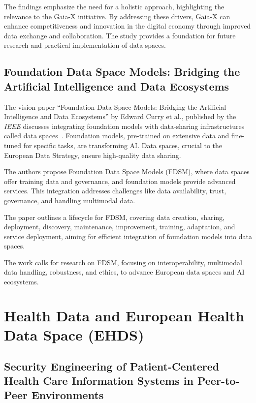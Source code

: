 The findings emphasize the need for a holistic approach, highlighting the relevance to the Gaia-X initiative.
By addressing these drivers, Gaia-X can enhance competitiveness and innovation in the digital economy through improved data exchange and collaboration.
The study provides a foundation for future research and practical implementation of data spaces.


\subsection{Foundation Data Space Models: Bridging the Artificial Intelligence and Data Ecosystems}\label{subsec:foundation-data-space-models:-bridging-the-artificial-intelligence-and-data-ecosystems}

The vision paper ``Foundation Data Space Models: Bridging the Artificial Intelligence and Data Ecosystems'' by Edward Curry et al., published by the \textit{IEEE} discusses integrating foundation models with data-sharing infrastructures called data spaces~\cite{foundation_data_space_models}.
Foundation models, pre-trained on extensive data and fine-tuned for specific tasks, are transforming AI. Data spaces, crucial to the European Data Strategy, ensure high-quality data sharing.

The authors propose Foundation Data Space Models (FDSM), where data spaces offer training data and governance, and foundation models provide advanced services.
This integration addresses challenges like data availability, trust, governance, and handling multimodal data.

The paper outlines a lifecycle for FDSM, covering data creation, sharing, deployment, discovery, maintenance, improvement, training, adaptation, and service deployment, aiming for efficient integration of foundation models into data spaces.

The work calls for research on FDSM, focusing on interoperability, multimodal data handling, robustness, and ethics, to advance European data spaces and AI ecosystems.

\section{Health Data and European Health Data Space (EHDS)}\label{sec:health-data-and-european-health-data-space}

\subsection{Security Engineering of Patient-Centered Health Care Information Systems in Peer-to-Peer Environments}\label{subsec:security-engineering-of-patient-centered-health-care-information-systems-in-peer-to-peer-environments}

